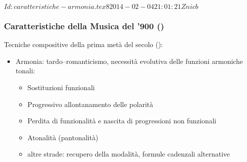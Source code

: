 %
%
\svnInfo $Id: caratteristiche-armonia.tex 8 2014-02-04 21:01:21Z nicb $

\setcounter{ms}{0}
\begin{frame}
    \frametitle{Caratteristiche della Musica del '900 ()}

    Tecniche compositive della prima met\`a del secolo ():

    \begin{itemize}

        \item Armonia: tardo--romanticismo, necessit\`a evolutiva delle funzioni armoniche tonali:

            \begin{itemize}

                \item Sostituzioni funzionali
                \item Progressivo allontanamento delle polarit\`a
                \item Perdita di funzionalit\`a e nascita di progressioni non funzionali
                \item Atonalit\`a (pantonalit\`a)
                \item altre strade: recupero della modalit\`a, formule cadenzali alternative

             \end{itemize}

    \end{itemize}

\end{frame}
